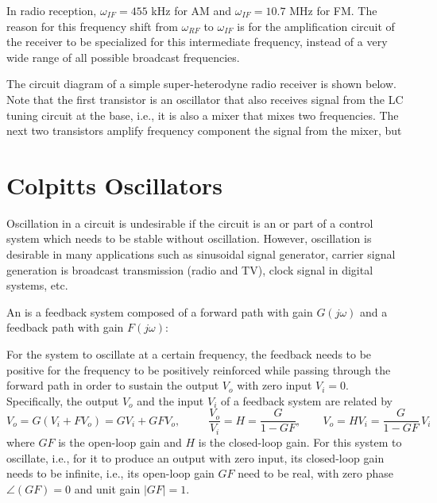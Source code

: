 \begin{itemize}
\begin{itemize}
In radio reception, $\omega_{IF}=455$ kHz for AM and $\omega_{IF}=10.7$ MHz for 
FM. The reason for this frequency shift from $\omega_{RF}$ to $\omega_{IF}$ is
for the amplification circuit of the receiver to be specialized for this
intermediate frequency, instead of a very wide range of all possible broadcast
frequencies.


The circuit diagram of a simple super-heterodyne radio receiver is shown below.
Note that the first transistor is an oscillator that also receives signal from
the LC tuning circuit at the base, i.e., it is also a mixer that mixes two
frequencies. The next two transistors amplify frequency component the signal from the mixer, but



\end{itemize}



\section{Colpitts Oscillators}

Oscillation in a circuit is undesirable if the circuit is an
or part of a control system which needs to be stable without oscillation.
However, oscillation is desirable in many applications such as sinusoidal
signal generator, carrier signal generation is broadcast transmission
(radio and TV), clock signal in digital systems, etc.

An 
is a feedback system composed of a forward path with gain $G(j\omega)$ 
and a feedback path with gain $F(j\omega)$:


For the system to oscillate at a certain frequency, the feedback 
needs to be positive for the frequency to be positively reinforced
while passing through the forward path in order to sustain the output
$V_o$ with zero input $V_i=0$. Specifically, the output $V_o$ and the 
input $V_i$ of a feedback system are related by
\[
V_o=G(V_i+FV_o)=GV_i+GFV_o,\;\;\;\;\;\;\;\;\;\frac{V_o}{V_i}=H=\frac{G}{1-GF},
\;\;\;\;\;\;\;V_o=HV_i=\frac{G}{1-GF}\,V_i
\]
where $GF$ is the open-loop gain and $H$ is the closed-loop gain.
For this system to oscillate, i.e., for it to produce an output with
zero input, its closed-loop gain needs to be infinite, i.e., its 
open-loop gain $GF$ need to be real, with zero phase $\angle(GF)=0$
and unit gain $|GF|=1$. 


\end{itemize}

